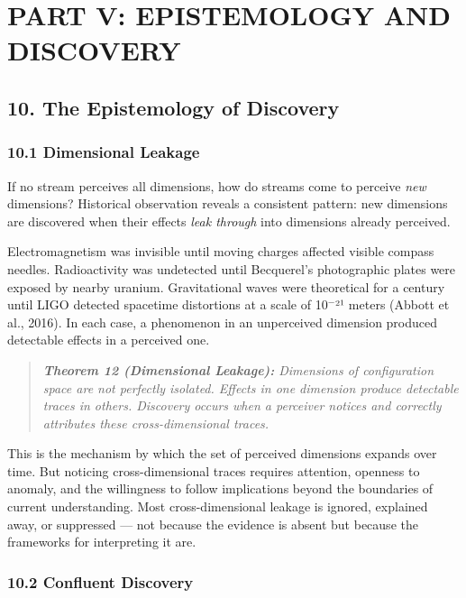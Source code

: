 \section*{PART V: EPISTEMOLOGY AND DISCOVERY}


\subsection*{10. The Epistemology of Discovery}


\subsubsection*{10.1 Dimensional Leakage}


If no stream perceives all dimensions, how do streams come to perceive \textit{new} dimensions? Historical observation reveals a consistent pattern: new dimensions are discovered when their effects \textit{leak through} into dimensions already perceived.


Electromagnetism was invisible until moving charges affected visible compass needles. Radioactivity was undetected until Becquerel's photographic plates were exposed by nearby uranium. Gravitational waves were theoretical for a century until LIGO detected spacetime distortions at a scale of 10$^{-}$²¹ meters (Abbott et al., 2016). In each case, a phenomenon in an unperceived dimension produced detectable effects in a perceived one.


\begin{quote}
\itshape
\textbf{Theorem 12 (Dimensional Leakage):} \textit{Dimensions of configuration space are not perfectly isolated. Effects in one dimension produce detectable traces in others. Discovery occurs when a perceiver notices and correctly attributes these cross-dimensional traces.}
\end{quote}


This is the mechanism by which the set of perceived dimensions expands over time. But noticing cross-dimensional traces requires attention, openness to anomaly, and the willingness to follow implications beyond the boundaries of current understanding. Most cross-dimensional leakage is ignored, explained away, or suppressed — not because the evidence is absent but because the frameworks for interpreting it are.


\subsubsection*{10.2 Confluent Discovery}


